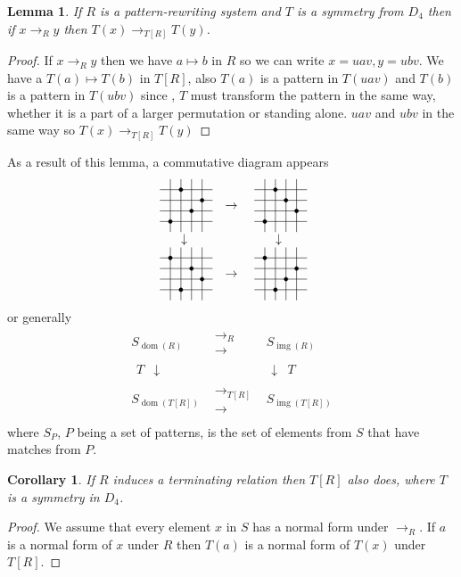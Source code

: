 \documentclass[a4paper, 11pt, english]{article}
\newcommand{\pattern}[4]{
  \raisebox{0.6ex}{
  \begin{tikzpicture}[scale=0.3, baseline=(current bounding box.center), #1]
    \foreach \x/\y in {#4}
      \fill[NE-lines] (\x,\y) rectangle +(1,1);
    \draw (0.01,0.01) grid (#2+0.99,#2+0.99);
    \foreach \x/\y in {#3}
      \filldraw (\x,\y) circle (5pt);
  \end{tikzpicture}}
}
\newcommand{\patternrule}{ \mapsto \!}
\newtheorem{lemma}[theorem]{Lemma}
\newtheorem{corollary}[theorem]{Corollary}
\theoremstyle{definition}
\newcommand{\Sym}{S}
\DeclareMathOperator{\dom}{dom}
\DeclareMathOperator{\img}{img}
\begin{document}
\begin{lemma}
    If $R$ is a pattern-rewriting system and $T$ is a symmetry from $D_4$ then if
    $x \to_R y$ then $T(x) \to_{T[R]} T(y)$.
\end{lemma}
\begin{proof}
    If $x \to_R y$ then we have $a \patternrule b$ in $R$ so we can write $x = u a v, y = u b v$. We
    have a $T(a) \patternrule T(b)$ in $T[R]$, also $T(a)$ is a pattern in $T(u a v)$ and $T(b)$ is
    a pattern in $T(u b v)$ since , $T$ must transform the pattern in the same way, whether it is a
    part of a larger permutation or standing alone. $uav$ and $ubv$ in the same way so $T(x) \to_{T[R]}
    T(y)$
\end{proof}

As a result of this lemma, a commutative diagram appears 
\[
  \begin{matrix}
  \pattern{}{4}{1/1, 2/4, 3/2, 4/3}{} & \to & \pattern{}{4}{1/1, 2/4, 3/3, 4/2}{} \\
  \downarrow & & \downarrow \\
  \pattern{}{4}{1/4, 2/1, 3/3, 4/2}{} & \to & \pattern{}{4}{1/4, 2/1, 3/2, 4/3}{} \\
  \end{matrix}
\]
or generally
\[
  \begin{matrix}
    \Sym_{\dom(R)} & \begin{matrix} \to_R \\ \to \end{matrix} & \Sym_{\img(R)} \\
    \begin{matrix}T & \downarrow\end{matrix} & & \begin{matrix} \downarrow & T \end{matrix} \\
    \Sym_{\dom(T[R])} & \begin{matrix} \to_{T[R]} \\ \to \end{matrix} & \Sym_{\img(T[R])} \\
  \end{matrix}
\]
where $\Sym_P$, $P$ being a set of patterns, is the set of elements from $\Sym$ that have matches from $P$.

\begin{corollary}
    If $R$ induces a terminating relation then $T[R]$ also does, where $T$ is a symmetry in $D_4$.
\end{corollary}
\begin{proof}
    We assume that every element $x$ in $\Sym$ has a normal form under $\to_R$.  
    If $a$ is a normal form of $x$ under $R$ then $T(a)$ is a normal form of $T(x)$ under $T[R]$.
\end{proof}
\end{document}
